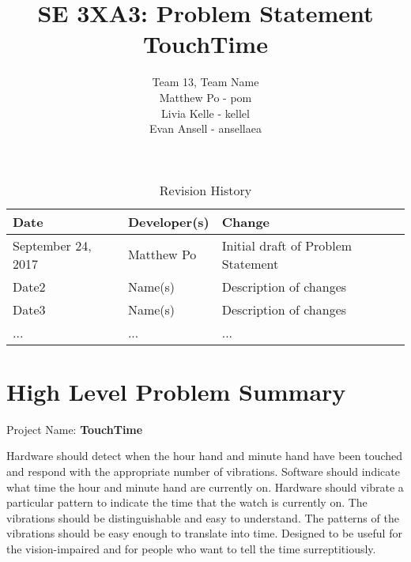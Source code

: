 \documentclass{article}
\title{SE 3XA3: Problem Statement\\TouchTime}
\author{Team 13, Team Name
		\\ Matthew Po - pom
		\\ Livia Kelle - kellel
		\\ Evan Ansell - ansellaea
}
\date{}
\begin{document}
\begin{table}[hp]
\caption{Revision History} \label{TblRevisionHistory}
\begin{tabularx}{\textwidth}{llX}
\toprule
\textbf{Date} & \textbf{Developer(s)} & \textbf{Change}\\
\midrule
September 24, 2017 & Matthew Po & Initial draft of Problem Statement\\
Date2 & Name(s) & Description of changes\\
Date3 & Name(s) & Description of changes\\
... & ... & ...\\
\bottomrule
\end{tabularx}
\end{table}

\newpage

\maketitle

\section{High Level Problem Summary}
Project Name: 
\textbf{TouchTime}
\vspace{0.3cm}

Hardware should detect when the hour hand and minute hand have been touched and respond with the appropriate number of vibrations. Software should indicate what time the hour and minute hand are currently on. Hardware should vibrate a particular pattern to indicate the time that the watch is currently on. The vibrations should be distinguishable and easy to understand. The patterns of the vibrations should be easy enough to translate into time. Designed to be useful for the vision-impaired and for people who want to tell the time surreptitiously.
\vspace{0.3cm}


\subsection{}




\end{document}
